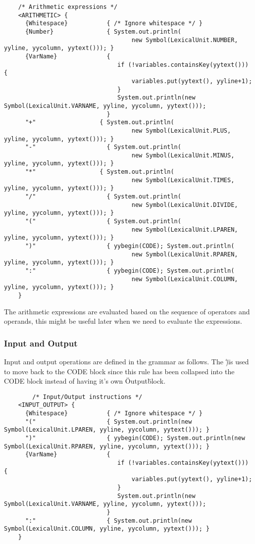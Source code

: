\documentclass{article}
\begin{document}
	\begin{verbatim}
	/* Arithmetic expressions */
	<ARITHMETIC> {
	  {Whitespace}           { /* Ignore whitespace */ }
	  {Number}               { System.out.println(
									new Symbol(LexicalUnit.NUMBER, yyline, yycolumn, yytext())); }
	  {VarName}              {
								if (!variables.containsKey(yytext())) {
									variables.put(yytext(), yyline+1);
								}
								System.out.println(new Symbol(LexicalUnit.VARNAME, yyline, yycolumn, yytext()));
							 }
	  "+"                  { System.out.println(
									new Symbol(LexicalUnit.PLUS, yyline, yycolumn, yytext())); }
	  "-"                    { System.out.println(
									new Symbol(LexicalUnit.MINUS, yyline, yycolumn, yytext())); }
	  "*"                  { System.out.println(
									new Symbol(LexicalUnit.TIMES, yyline, yycolumn, yytext())); }
	  "/"                    { System.out.println(
									new Symbol(LexicalUnit.DIVIDE, yyline, yycolumn, yytext())); }
	  "("                    { System.out.println(
									new Symbol(LexicalUnit.LPAREN, yyline, yycolumn, yytext())); }
	  ")"                    { yybegin(CODE); System.out.println(
									new Symbol(LexicalUnit.RPAREN, yyline, yycolumn, yytext())); }
	  ":"                    { yybegin(CODE); System.out.println(
									new Symbol(LexicalUnit.COLUMN, yyline, yycolumn, yytext())); }
	}

	\end{verbatim}

	The arithmetic expressions are evaluated based on the sequence of operators and operands, this might be useful later when we need to evaluate the expressions.\\

	\subsubsection{Input and Output}
	Input and output operations are defined in the grammar as follows.
	The \")\" is used to move back to the CODE block since this rule has been collapsed into the CODE block instead of having it's own \"Output\" block.\\
	\begin{verbatim}
		/* Input/Output instructions */
	<INPUT_OUTPUT> {
	  {Whitespace}           { /* Ignore whitespace */ }
	  "("                    { System.out.println(new Symbol(LexicalUnit.LPAREN, yyline, yycolumn, yytext())); }
	  ")"                    { yybegin(CODE); System.out.println(new Symbol(LexicalUnit.RPAREN, yyline, yycolumn, yytext())); }
	  {VarName}              {
								if (!variables.containsKey(yytext())) {
									variables.put(yytext(), yyline+1);
								}
								System.out.println(new Symbol(LexicalUnit.VARNAME, yyline, yycolumn, yytext()));
							 }
	  ":"                    { System.out.println(new Symbol(LexicalUnit.COLUMN, yyline, yycolumn, yytext())); }
	}
	\end{verbatim}
\end{document}
